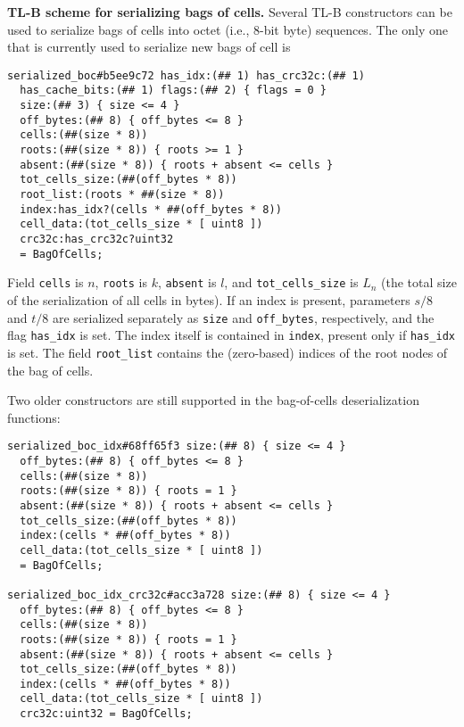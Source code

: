 \documentclass[12pt,oneside]{article}
\def\makepoint#1{\medbreak\noindent{\bf #1.\ }}
\def\nxsubpoint{\refstepcounter{subsubsection}%
  \smallbreak\makepoint{\thesubsubsection}}
\def\emb#1{\textbf{#1.}}
\begin{document}
\nxsubpoint\label{sp:boc.ser.sch}\emb{TL-B scheme for serializing bags of cells}
Several TL-B constructors can be used to serialize bags of cells into octet (i.e., 8-bit byte) sequences. The only one that is currently used to serialize new bags of cell is
\begin{verbatim}
serialized_boc#b5ee9c72 has_idx:(## 1) has_crc32c:(## 1)
  has_cache_bits:(## 1) flags:(## 2) { flags = 0 }
  size:(## 3) { size <= 4 }
  off_bytes:(## 8) { off_bytes <= 8 }
  cells:(##(size * 8))
  roots:(##(size * 8)) { roots >= 1 }
  absent:(##(size * 8)) { roots + absent <= cells }
  tot_cells_size:(##(off_bytes * 8))
  root_list:(roots * ##(size * 8))
  index:has_idx?(cells * ##(off_bytes * 8))
  cell_data:(tot_cells_size * [ uint8 ])
  crc32c:has_crc32c?uint32
  = BagOfCells;
\end{verbatim}
Field {\tt cells} is $n$, {\tt roots} is $k$, {\tt absent} is $l$, and {\tt tot\_cells\_size} is $L_n$ (the total size of the serialization of all cells in bytes). If an index is present, parameters $s/8$ and $t/8$ are serialized separately as {\tt size} and {\tt off\_bytes}, respectively, and the flag {\tt has\_idx} is set. The index itself is contained in {\tt index}, present only if {\tt has\_idx} is set. The field {\tt root\_list} contains the (zero-based) indices of the root nodes of the bag of cells.

Two older constructors are still supported in the bag-of-cells deserialization functions:
\begin{verbatim}
serialized_boc_idx#68ff65f3 size:(## 8) { size <= 4 }
  off_bytes:(## 8) { off_bytes <= 8 }
  cells:(##(size * 8))
  roots:(##(size * 8)) { roots = 1 }
  absent:(##(size * 8)) { roots + absent <= cells }
  tot_cells_size:(##(off_bytes * 8))
  index:(cells * ##(off_bytes * 8))
  cell_data:(tot_cells_size * [ uint8 ])
  = BagOfCells;

serialized_boc_idx_crc32c#acc3a728 size:(## 8) { size <= 4 }
  off_bytes:(## 8) { off_bytes <= 8 }
  cells:(##(size * 8))
  roots:(##(size * 8)) { roots = 1 }
  absent:(##(size * 8)) { roots + absent <= cells }
  tot_cells_size:(##(off_bytes * 8))
  index:(cells * ##(off_bytes * 8))
  cell_data:(tot_cells_size * [ uint8 ])
  crc32c:uint32 = BagOfCells;
\end{verbatim}
\end{document}
